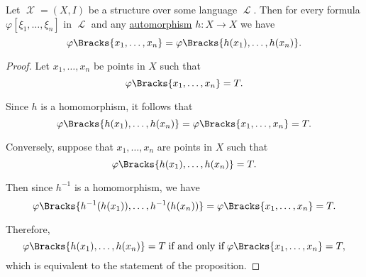 \begin{proposition}\label{thm:automorphism_preserves_validity}
  Let \( \mscrX = (X, I) \) be a structure over some language \( \mscrL \). Then for every formula \( \varphi[\xi_1, \ldots, \xi_n] \) in \( \mscrL \) and any \hyperref[def:first_order_automorphism]{automorphism} \( h: X \to X \) we have
  \begin{equation*}
    \varphi\Bracks{x_1, \ldots, x_n} = \varphi\Bracks{h(x_1), \ldots, h(x_n)}.
  \end{equation*}
\end{proposition}
\begin{proof}
  Let \( x_1, \ldots, x_n \) be points in \( X \) such that
  \begin{equation*}
    \varphi\Bracks{x_1, \ldots, x_n} = T.
  \end{equation*}

  Since \( h \) is a homomorphism, it follows that
  \begin{equation*}
    \varphi\Bracks{h(x_1), \ldots, h(x_n)} = \varphi\Bracks{x_1, \ldots, x_n} = T.
  \end{equation*}

  Conversely, suppose that \( x_1, \ldots, x_n \) are points in \( X \) such that
  \begin{equation*}
    \varphi\Bracks{h(x_1), \ldots, h(x_n)} = T.
  \end{equation*}

  Then since \( h^{-1} \) is a homomorphism, we have
  \begin{equation*}
    \varphi\Bracks{h^{-1}(h(x_1)), \ldots, h^{-1}(h(x_n))}
    =
    \varphi\Bracks{x_1, \ldots, x_n}
    =
    T.
  \end{equation*}

  Therefore,
  \begin{equation*}
    \varphi\Bracks{h(x_1), \ldots, h(x_n)} = T \T{if and only if} \varphi\Bracks{x_1, \ldots, x_n} = T,
  \end{equation*}
  which is equivalent to the statement of the proposition.
\end{proof}

